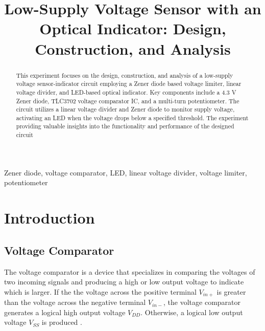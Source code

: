 \documentclass[conference]{IEEEtran}
\begin{document}
\title{ Low-Supply Voltage Sensor with an Optical Indicator: Design, Construction, and Analysis}

\author{
}

\maketitle

\begin{abstract}
This experiment focuses on the design, construction, and analysis of a low-supply voltage sensor-indicator circuit employing a Zener diode based voltage limiter, linear voltage divider, and LED-based optical indicator. Key components include a 4.3 V Zener diode, TLC3702 voltage comparator IC, and a multi-turn potentiometer. The circuit utilizes a linear voltage divider and Zener diode to monitor supply voltage, activating an LED when the voltage drops below a specified threshold. The experiment providing valuable insights into the functionality and performance of the designed circuit

\end{abstract}

\begin{IEEEkeywords}
Zener diode, voltage comparator, LED, linear voltage divider, voltage limiter, potentiometer
\end{IEEEkeywords}

\section{Introduction}

\subsection{Voltage Comparator}

The voltage comparator is a device that specializes in comparing the voltages of two incoming signals and producing a high or low output voltage to indicate which is larger. If the the voltage across the positive terminal $V_{in+}$ is greater than the voltage across the negative terminal $V_{in-}$, the voltage comparator generates a logical high output voltage $V_{DD}$. Otherwise, a logical low output voltage $V_{SS}$ is produced \cite{week6}.
\end{document}
